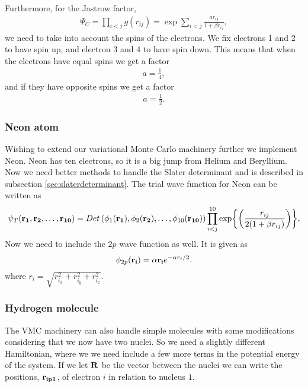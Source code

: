		Furthermore, for the Jastrow factor,
		\begin{align}
			\Psi_{C}=\prod_{i<j}g(r_{ij})=\exp{\sum_{i<j}\frac{ar_{ij}}{1+\beta r_{ij}}},
		\end{align}
		we need to take into account the spins of the electrons. We fix electrons
		1 and 2 to have spin up, and electron 3 and 4 to have spin down. This
		means that when the electrons have equal spins we get a factor
		\begin{align}
			a=\frac{1}{4},
		\end{align}
		and if they have opposite spins we get a factor
		\begin{align}
			a=\frac{1}{2}.
		\end{align}

	\subsubsection{Neon atom}

		Wishing to extend our variational Monte Carlo machinery further we implement Neon. Neon has ten electrons, so it is a big jump from Helium and Beryllium. Now we need better methods to handle the Slater determinant and is described in subsection \ref{sec:slaterdeterminant}. The trial wave function for Neon can be written as
		\begin{equation}
		   \psi_{T}({\bf r_1},{\bf r_2}, \dots,{\bf r_{10}}) =
		   Det\left(\phi_{1}({\bf r_1}),\phi_{2}({\bf r_2}),
		   \dots,\phi_{10}({\bf r_{10}})\right)
		   \prod_{i<j}^{10}\exp{\left(\frac{r_{ij}}{2(1+\beta r_{ij})}\right)},
		   \label{eq:NeonTrialFunction}
		\end{equation}
		Now we need to include the $2p$ wave function as well. It is given as
		\begin{equation}
			\phi_{2p}({\bf r_i}) = \alpha {\bf r_i}e^{-\alpha r_i/2}.
		\end{equation}
		where $ {r_i} = \sqrt{r_{i_x}^2+r_{i_y}^2+r_{i_z}^2}$.



	\subsubsection{Hydrogen molecule}
		\label{sec:H2}
		The VMC machinery can also handle simple molecules with some modifications considering that we now have two nuclei. So we need a slightly different Hamiltonian, where we we need include a few more terms in the potential energy of the system. If we let \(\vb{R}\) be the vector between the nuclei we can write the positions, \(\vb{r_{ip1}}\), of electron \(i\) in relation to nucleus \(1\).

